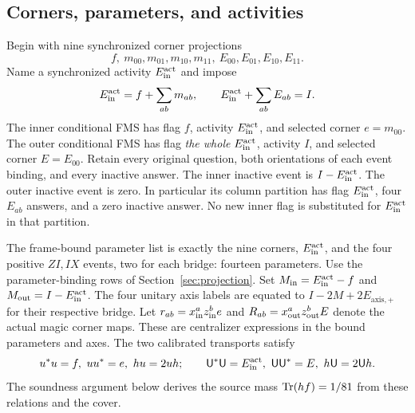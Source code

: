 \subsection{Corners, parameters, and activities}
Begin with nine synchronized corner projections
\[
 f,\ m_{00},m_{01},m_{10},m_{11},\ E_{00},E_{01},E_{10},E_{11}.
\]
Name a synchronized activity ${E^{\rm act}_{\rm in}}$ and impose
\begin{equation}
 {E^{\rm act}_{\rm in}}=f+\sum_{ab}m_{ab},\qquad {E^{\rm act}_{\rm in}}+\sum_{ab}E_{ab}=I.
                                                               \label{eq:nested-N2}
\end{equation}
The inner conditional FMS has flag $f$, activity ${E^{\rm act}_{\rm in}}$, and selected corner
$e=m_{00}$. The outer conditional FMS has flag \emph{the whole ${E^{\rm act}_{\rm in}}$},
activity $I$, and selected corner $E=E_{00}$. Retain every original
question, both orientations of each event binding, and every inactive
answer. The inner inactive event is $I-{E^{\rm act}_{\rm in}}$. The outer inactive event is
zero. In particular its column partition has flag ${E^{\rm act}_{\rm in}}$, four $E_{ab}$
answers, and a zero inactive answer. No new inner flag is substituted
for ${E^{\rm act}_{\rm in}}$ in that partition.

The frame-bound parameter list is exactly the nine corners, ${E^{\rm act}_{\rm in}}$, and
the four positive $ZI,IX$ events, two for each bridge: fourteen
parameters. Use the parameter-binding rows of Section~\ref{sec:projection}.
Set $M_{\rm in}={E^{\rm act}_{\rm in}}-f$ and $M_{\rm out}=I-{E^{\rm act}_{\rm in}}$. The four unitary axis labels
are equated to $I-2M+2E_{\mathrm{axis},+}$ for their respective bridge.
Let $r_{ab}=x_{\rm in}^az_{\rm in}^be$ and
$R_{ab}=x_{\rm out}^az_{\rm out}^bE$ denote the actual magic corner maps.
These are centralizer expressions in the bound parameters and axes.
The two calibrated transports satisfy
\begin{equation}
 u^*u=f,\ uu^*=e,\ hu=2uh;\qquad
 {\btrans}^*{\btrans}={\Pact_{\rm in}},\ {\btrans}{\btrans}^*=E,\ h{\btrans}=2{\btrans}h.                                 \label{eq:nested-N3}
\end{equation}
The soundness argument below derives the source mass $\operatorname{Tr}(hf)=1/81$ from these relations and the cover.

